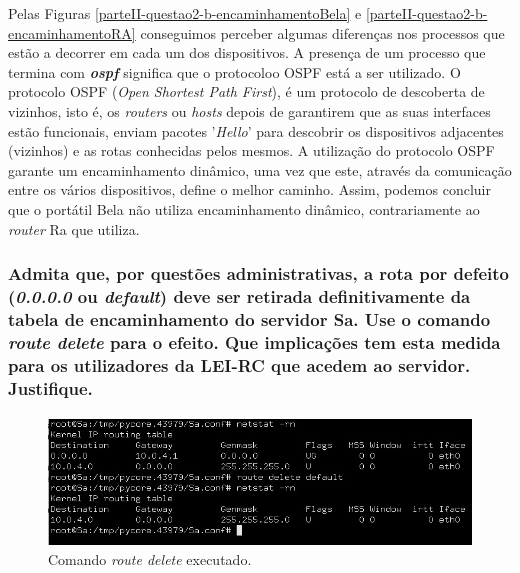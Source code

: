     
    \par Pelas Figuras \ref{parteII-questao2-b-encaminhamentoBela} e \ref{parteII-questao2-b-encaminhamentoRA} conseguimos perceber algumas diferenças nos processos que estão a decorrer em cada um dos dispositivos. A presença de um processo que termina com \textit{\textbf{ospf}} significa que o protocoloo OSPF está a ser utilizado. O protocolo OSPF (\textit{Open Shortest Path First}), é um protocolo de descoberta de vizinhos, isto é, os \textit{routers} ou \textit{hosts} depois de garantirem que as suas interfaces estão funcionais, enviam pacotes '\textit{Hello}' para descobrir os dispositivos adjacentes (vizinhos) e as rotas conhecidas pelos mesmos. A utilização do protocolo OSPF garante um encaminhamento dinâmico, uma vez que este, através da comunicação entre os vários dispositivos, define o melhor caminho.
    Assim, podemos concluir que o portátil Bela não utiliza encaminhamento dinâmico, contrariamente ao \textit{router} Ra que utiliza.
    
    
    
    
    
\subsubsection{Admita que, por questões administrativas, a rota por defeito (\textit{\textbf{0.0.0.0}} ou \textit{\textbf{default}}) deve ser retirada definitivamente da tabela de encaminhamento do servidor Sa. Use o comando \textit{\textbf{route delete}} para o efeito. Que implicações tem esta medida para os utilizadores da LEI-RC que acedem ao servidor. Justifique.}
    
    \paragraph{}
    \paragraph{}
    \begin{figure}[H]
    \centering
    \includegraphics[width=400pt]{images/ParteII/Questao2/parteII-questao2-c-SA-delete.jpg}
    \caption{Comando \textit{route delete} executado.} \label{parteII-questao2-c-deleteSA}
    \end{figure} 
    

